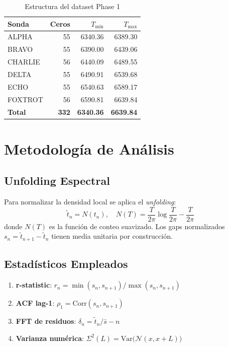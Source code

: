 \documentclass[12pt, a4paper]{article}
\begin{document}
\begin{table}[H]
\centering
\caption{Estructura del dataset Phase 1}
\begin{tabular}{lrrr}
\toprule
\textbf{Sonda} & \textbf{Ceros} & \textbf{$T_{\min}$} & \textbf{$T_{\max}$} \\
\midrule
ALPHA   & 55 & 6340.36 & 6389.30 \\
BRAVO   & 55 & 6390.00 & 6439.06 \\
CHARLIE & 56 & 6440.09 & 6489.55 \\
DELTA   & 55 & 6490.91 & 6539.68 \\
ECHO    & 55 & 6540.63 & 6589.17 \\
FOXTROT & 56 & 6590.81 & 6639.84 \\
\midrule
\textbf{Total} & \textbf{332} & \textbf{6340.36} & \textbf{6639.84} \\
\bottomrule
\end{tabular}
\end{table}

\section{Metodología de Análisis}

\subsection{Unfolding Espectral}

Para normalizar la densidad local se aplica el \emph{unfolding}:
\[
  \tilde{t}_n = N(t_n), \quad
  N(T) = \frac{T}{2\pi}\log\frac{T}{2\pi} - \frac{T}{2\pi}
\]
donde $N(T)$ es la función de conteo suavizado. Los gaps normalizados
$s_n = \tilde{t}_{n+1} - \tilde{t}_n$ tienen media unitaria por construcción.

\subsection{Estadísticos Empleados}

\begin{enumerate}
  \item \textbf{r-statistic}: $r_n = \min(s_n, s_{n+1})/\max(s_n, s_{n+1})$
  \item \textbf{ACF lag-1}: $\rho_1 = \text{Corr}(s_n, s_{n+1})$
  \item \textbf{FFT de residuos}: $\delta_n = \tilde{t}_n/\bar{s} - n$
  \item \textbf{Varianza numérica}: $\Sigma^2(L) = \text{Var}\bigl(\mathcal{N}(x, x+L)\bigr)$
\end{enumerate}
\end{document}
